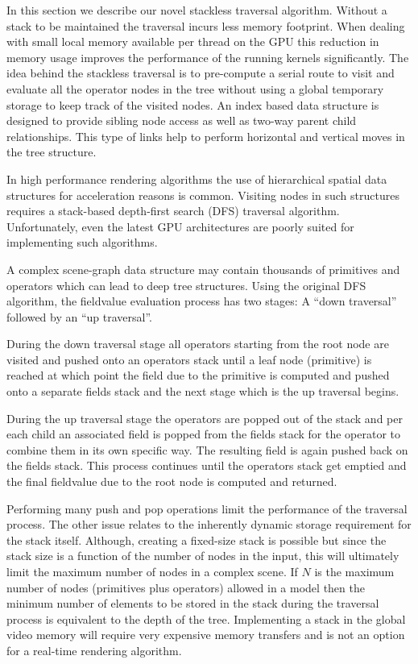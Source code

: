 In this section we describe our novel stackless \blob traversal algorithm. 
Without a stack to be maintained the \blob traversal incurs less memory footprint. When dealing with small 
local memory available per thread on the GPU this reduction in memory usage improves the performance of the 
running kernels significantly. The idea behind the stackless traversal is to pre-compute a serial route to 
visit and evaluate all the operator nodes in the tree without using a global temporary storage to keep 
track of the visited nodes. An index based data structure is designed to provide sibling node access 
as well as two-way parent child relationships. This type of links help to perform horizontal and 
vertical moves in the tree structure.


In high performance rendering algorithms the use of hierarchical spatial data structures for acceleration reasons 
is common. Visiting nodes in such structures requires a stack-based depth-first search (DFS) traversal algorithm. 
Unfortunately, even the latest GPU architectures are poorly suited for implementing such algorithms. 

A complex \blob scene-graph data structure may contain thousands of primitives and operators which 
can lead to deep tree structures. Using the original DFS algorithm, the fieldvalue evaluation 
process has two stages: A ``down traversal'' followed by an ``up traversal''. 

During the down traversal stage all operators starting from the root node are visited and pushed onto an 
operators stack until a leaf node (primitive) is reached at which point the field due to the primitive is 
computed and pushed onto a separate fields stack and the next stage which is the up traversal begins.

During the up traversal stage the operators are popped out of the stack and per each child an associated field is popped from the fields stack for the 
operator to combine them in its own specific way. The resulting field is again pushed back on the fields stack.  This process continues until the 
operators stack get emptied and the final fieldvalue due to the root node is computed and returned.

Performing many push and pop operations limit the performance of the traversal process. The other issue 
relates to the inherently dynamic storage requirement for the stack itself. Although, creating a fixed-size 
stack is possible but since the stack size is a function of the number of nodes in the input, this will 
ultimately limit the maximum number of nodes in a complex scene. If $N$ is the maximum number of nodes 
(primitives plus operators) allowed in a \blob model then the minimum number of elements to be stored 
in the stack during the traversal process is equivalent to the depth of the tree. Implementing a stack in the 
global video memory will require very expensive memory transfers and is not an option for a real-time 
rendering algorithm. 

